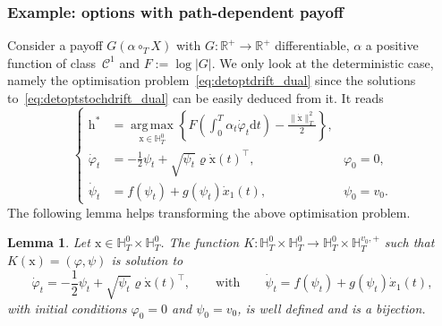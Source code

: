 \documentclass{amsart}[11pt]
\numberwithin{equation}{section}
\numberwithin{theorem}{subsection}
\numberwithin{proposition}{subsection}
\numberwithin{definition}{subsection}
\newtheorem{lemma}{Lemma}
\numberwithin{lemma}{subsection}
\numberwithin{assumption}{subsection}
\newcommand{\Cc}{\mathcal{C}}
\newcommand{\HH}{\mathbb{H}}
\newcommand{\RR}{\mathbb{R}}
\newcommand{\cT}{\circ_{T}}
\newcommand{\vrho}{\boldsymbol{\mathrm{\varrho}}}
\newcommand{\D}{\mathrm{d}}
\newcommand{\hh}{\boldsymbol{\mathrm{h}}}
\newcommand{\xx}{\boldsymbol{\mathrm{x}}}
\DeclareMathOperator*{\argmax}{arg\,max}
\begin{document}
\subsubsection{Example: options with path-dependent payoff}
\label{sec:PayoffPathDepG}
 Consider a payoff $G(\alpha\cT X)$ with ${G:\RR^{+} \rightarrow \RR^{+}}$ differentiable, 
$\alpha$ a positive function of class~$\Cc^1$ and $F := \log|G|$. 
We only look at the deterministic case, 
namely the optimisation problem~\eqref{eq:detoptdrift_dual} since the solutions to~\eqref{eq:detoptstochdrift_dual} can be easily deduced from it. It reads
\begin{equation*}
\left\{
\begin{array}{rll}
\hh^* & = \displaystyle \argmax\limits_{\xx\in \HH_T^0} 
\left\{F\left(\int_0^T\alpha_t \dot{\varphi}_t \D t\right) - \frac{\|\dot{\xx}\|_{T}^2}{2}\right\},\\
\dot{\varphi}_t & = \displaystyle -\frac{1}{2}\psi_t + \sqrt{\psi_t}\vrho \dot{\xx}(t)^\top, & \varphi_0 = 0,\\
\dot{\psi}_t & = \displaystyle f(\psi_t) + g(\psi_t) \dot{x}_1(t), & \psi_0 = v_0.
\end{array}
\right.
\end{equation*}
The following lemma helps transforming the above optimisation problem.
\begin{lemma}\label{lem:Simplify}
Let $\xx\in \HH_T^0 \times \HH_T^0$. The function $K:\HH_T^0 \times \HH_T^0 \rightarrow \HH_T^0\times \HH_T^{v_0,+}$ such that $K(\xx)=(\varphi,\psi)$ is solution to
$$
\dot{\varphi}_t  = -\frac{1}{2}\psi_t + \sqrt{\psi_t}\vrho \dot{\xx}(t)^\top,
\qquad\text{with}\qquad
\dot{\psi}_t = f(\psi_t) + g(\psi_t) \dot{x}_1(t),
$$
with initial conditions $\varphi_0 = 0$ and $\psi_0 = v_0$, is well defined and is a bijection.
\end{lemma}
\end{document}
